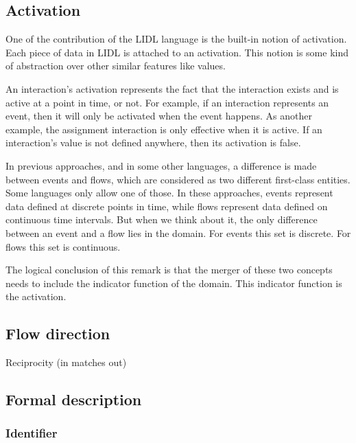 \subsection{Activation}

One of the contribution of the LIDL language is the built-in notion of activation. Each piece of data in LIDL is attached to an activation. This notion is some kind of abstraction over other similar features like  values.

An interaction's activation represents the fact that the interaction exists and is active at a point in time, or not. For example, if an interaction represents an event, then it will only be activated when the event happens. As another example, the assignment interaction \code{$=$} is only effective when it is active. If an interaction's value is not defined anywhere, then its activation is false.




In previous approaches, and in some other languages, a difference is made between events and flows, which are considered as two different first-class entities. Some languages only allow one of those. In these approaches, events represent data defined at discrete points in time, while flows represent data defined on continuous time intervals. But when we think about it, the only difference between an event and a flow lies in the domain. For events this set is discrete. For flows this set is continuous.

The logical conclusion of this remark is that the merger of these two concepts needs to include the indicator function of the domain. This indicator function is the activation.

\subsection{Flow direction}

Reciprocity (in matches out)

\subsection{Formal description}


\subsubsection{Identifier}

